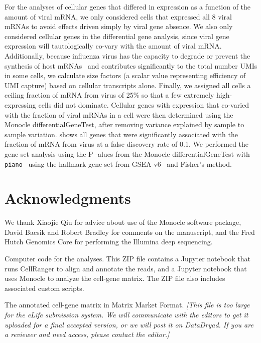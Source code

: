 \documentclass[9pt,lineno]{elife}
\newcommand{\jdbcomment}[1]{\emph{\color{red} [#1]}}
\begin{document}
For the analyses of cellular genes that differed in expression as a function of the amount of viral mRNA, we only considered cells that expressed all 8 viral mRNAs to avoid effects driven simply by viral gene absence.
We also only considered cellular genes in the differential gene analysis, since viral gene expression will tautologically co-vary with the amount of viral mRNA.
Additionally, because influenza virus has the capacity to degrade or prevent the synthesis of host mRNAs~\citep{BercovichKinori:2016iw} and contributes significantly to the total number UMIs in some cells, we calculate size factors (a scalar value representing efficiency of UMI capture) based on cellular transcripts alone. 
Finally, we assigned all cells a ceiling fraction of mRNA from virus of 25\% so that a few extremely high-expressing cells did not dominate. 
Cellular genes with expression that co-varied with the fraction of viral mRNAs in a cell were then determined using the Monocle differentialGeneTest, after removing variance explained by sample to sample variation. 
 shows all genes that were significantly associated with the fraction of mRNA from virus at a false discovery rate of 0.1.
We performed the gene set analysis using the P -alues from the Monocle differentialGeneTest with \texttt{piano}~\citep{varemo2013enriching} using the hallmark gene set from GSEA v6~\citep{subramanian2005gene} and Fisher's method.

\section{Acknowledgments}
We thank Xiaojie Qiu for advice about use of the Monocle software package, David Bacsik and Robert Bradley for comments on the manuscript, and the Fred Hutch Genomics Core for performing the Illumina deep sequencing.



\clearpage

\begin{suppfile}
\caption{\label{suppfile:code}
Computer code for the analyses.
This ZIP file contains a Jupyter notebook that runs CellRanger to align and annotate the reads, and a Jupyter notebook that uses Monocle to analyze the cell-gene matrix.
The ZIP file also includes associated custom scripts.}
\end{suppfile}

\begin{suppfile}
\caption{\label{suppfile:cellgenematrix}
The annotated cell-gene matrix in Matrix Market Format.
\jdbcomment{This file is too large for the \textit{eLife} submission system. We will communicate with the editors to get it uploaded for a final accepted version, or we will post it on DataDryad. If you are a reviewer and need access, please contact the editor.}
}
\end{suppfile}
\end{document}
